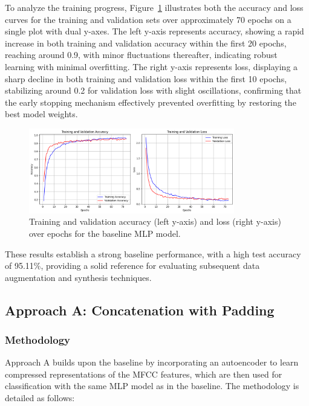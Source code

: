 \documentclass[12pt]{article}
\begin{document}
To analyze the training progress, Figure~\ref{fig:train_progress} illustrates both the accuracy and loss curves for the training and validation sets over approximately 70 epochs on a single plot with dual y-axes. The left y-axis represents accuracy, showing a rapid increase in both training and validation accuracy within the first 20 epochs, reaching around 0.9, with minor fluctuations thereafter, indicating robust learning with minimal overfitting. The right y-axis represents loss, displaying a sharp decline in both training and validation loss within the first 10 epochs, stabilizing around 0.2 for validation loss with slight oscillations, confirming that the early stopping mechanism effectively prevented overfitting by restoring the best model weights.

\begin{figure}[h]
    \centering
    \includegraphics[width=0.8\textwidth]{train_baseline.png}
    \caption{Training and validation accuracy (left y-axis) and loss (right y-axis) over epochs for the baseline MLP model.}
    \label{fig:train_progress}
\end{figure}

These results establish a strong baseline performance, with a high test accuracy of 95.11\%, providing a solid reference for evaluating subsequent data augmentation and synthesis techniques.

\subsection{Approach A: Concatenation with Padding}
\subsubsection{Methodology}

Approach A builds upon the baseline by incorporating an autoencoder to learn compressed representations of the MFCC features, which are then used for classification with the same MLP model as in the baseline. The methodology is detailed as follows:
\end{document}

